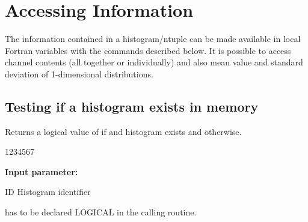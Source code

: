 \chapter{Accessing Information}
\label{HACCINFO}
 
The information contained in a histogram/ntuple can be made available in
%
%
%
%
%
local Fortran variables with the commands described below.  It is possible
to access channel contents (all together or individually) and also mean
value and standard deviation of 1-dimensional distributions.
 
\section{Testing if a histogram exists in memory}
\label{HISEXIST}
 
 
\Action
Returns a logical value of  if and histogram exists
and  otherwise.
 
\begin{DLtt}{1234567}
\item[{\rm\bf Input parameter:}]
\item[ID] Histogram identifier
\end{DLtt}
 
\Remark
{} has to be declared LOGICAL in the calling routine.

